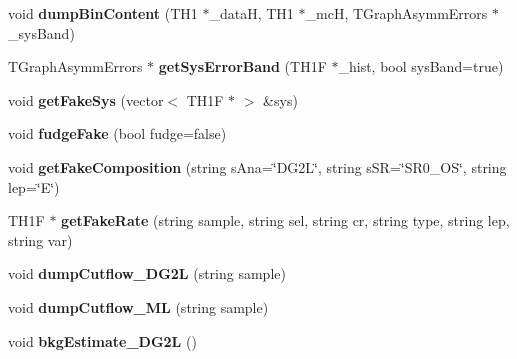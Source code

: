 \begin{DoxyCompactItemize}
\item 
\hypertarget{classDrawPlots_a3b05b04ec7e218bb33f91ec3a4265b4d}{
void {\bfseries dumpBinContent} (TH1 $\ast$\_\-dataH, TH1 $\ast$\_\-mcH, TGraphAsymmErrors $\ast$\_\-sysBand)}
\label{classDrawPlots_a3b05b04ec7e218bb33f91ec3a4265b4d}

\item 
\hypertarget{classDrawPlots_a425585bbc540d6e75a9c6bfb637361b8}{
TGraphAsymmErrors $\ast$ {\bfseries getSysErrorBand} (TH1F $\ast$\_\-hist, bool sysBand=true)}
\label{classDrawPlots_a425585bbc540d6e75a9c6bfb637361b8}

\item 
\hypertarget{classDrawPlots_a459affc780a73e5ddab085661d2cfe1e}{
void {\bfseries getFakeSys} (vector$<$ TH1F $\ast$ $>$ \&sys)}
\label{classDrawPlots_a459affc780a73e5ddab085661d2cfe1e}

\item 
\hypertarget{classDrawPlots_a5bdbe97b3c8b6581c523369099da055d}{
void {\bfseries fudgeFake} (bool fudge=false)}
\label{classDrawPlots_a5bdbe97b3c8b6581c523369099da055d}

\item 
\hypertarget{classDrawPlots_aadf8da50c53a2a328fba50392dfedef9}{
void {\bfseries getFakeComposition} (string sAna=\char`\"{}DG2L\char`\"{}, string sSR=\char`\"{}SR0\_\-OS\char`\"{}, string lep=\char`\"{}E\char`\"{})}
\label{classDrawPlots_aadf8da50c53a2a328fba50392dfedef9}

\item 
\hypertarget{classDrawPlots_a3a367889149c99c7469cd5272445ca00}{
TH1F $\ast$ {\bfseries getFakeRate} (string sample, string sel, string cr, string type, string lep, string var)}
\label{classDrawPlots_a3a367889149c99c7469cd5272445ca00}

\item 
\hypertarget{classDrawPlots_aa5ee262963d0c95a57480a592c65969b}{
void {\bfseries dumpCutflow\_\-DG2L} (string sample)}
\label{classDrawPlots_aa5ee262963d0c95a57480a592c65969b}

\item 
\hypertarget{classDrawPlots_ae5d8b16fd8b8ada9f57ebd94f4d5e55d}{
void {\bfseries dumpCutflow\_\-ML} (string sample)}
\label{classDrawPlots_ae5d8b16fd8b8ada9f57ebd94f4d5e55d}

\item 
\hypertarget{classDrawPlots_ab7168c84be520dd0fa55551d962b96ef}{
void {\bfseries bkgEstimate\_\-DG2L} ()}
\label{classDrawPlots_ab7168c84be520dd0fa55551d962b96ef}


\end{DoxyCompactItemize}
